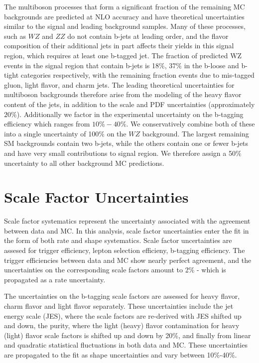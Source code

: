 The multiboson processes that form a significant fraction of the remaining MC backgrounds are predicted at NLO accuracy and have theoretical uncertainties
similar to the signal and leading background samples. Many of these processes, such as $WZ$ and $ZZ$ do not contain b-jets at leading order, and the flavor
composition of their additional jets in part affects their yields in this signal region, which requires at least one b-tagged jet. 
The fraction of predicted WZ events in the signal region that contain b-jets is 18$\%$, 37$\%$ in the b-loose and b-tight categories respectively, with the
remaining fraction events due to mis-tagged gluon, light flavor, and charm jets. 
The leading theoretical uncertainties for multiboson backgrounds therefore arise from the modeling of the heavy flavor content of the jets,
in addition to the scale and PDF uncertainties (approximately $20\%$). Additionally we factor in the experimental uncertainty on the b-tagging efficiency
which ranges from $10\%-40\%$. We conservatively combine both of these into a single uncertainty of 100$\%$ on the $WZ$ background. The largest remaining SM
backgrounds contain two b-jets, while the others contain one or fewer b-jets and have very small contributions to signal region. We therefore
assign a 50$\%$ uncertainty to all other background MC predictions. 

\section{Scale Factor Uncertainties}
Scale factor systematics represent the uncertainty associated with the agreement between data and MC. In this analysis,
scale factor uncertainties enter the fit in the form of both rate and shape systematics. Scale factor uncertainties are assesed for trigger efficiency,
lepton selection efficieny, b-tagging efficiency. The trigger efficiencies between data and MC show nearly perfect agreement, and the uncertainties on the corresponding
scale factors amount to 2$\%$ - which is propagated as a rate uncertainty.

The uncertainties on the b-tagging scale factors are assessed for heavy flavor, charm flavor and light flavor separately.
These uncertainties include the jet energy scale (JES), where the scale factors are re-derived with JES shifted up and down,
the purity, where the light (heavy) flavor contamination for heavy (light) flavor scale factors is shifted up and down by 20$\%$,
and finally from linear and quadratic statistical fluctuations in both data and MC. 
These uncertainties are propagated to the fit as shape uncertainties and vary between 10$\%$-40$\%$.

